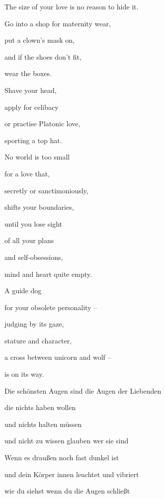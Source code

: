 \bigskip

The size of your love is no reason to hide it.


\bigskip

Go into a shop for maternity wear,

put a clown's mask on, 

and if the shoes don't fit,

wear the boxes.


\bigskip

Shave your head,

apply for celibacy

or practise Platonic love,

sporting a top hat.


\bigskip

No world is too small

for a love that,

secretly or sanctimoniously,

shifts your boundaries,


\bigskip

until you lose sight

of all your plans 

and self-obsessions,

mind and heart quite empty.


\bigskip

A guide dog 

for your obsolete personality -- 

judging by its gaze,

stature and character, 


\bigskip

a cross between unicorn and wolf --

is on its way.


\bigskip


\bigskip



\bigskip

Die schönsten Augen sind die Augen der Liebenden

die nichts haben wollen

und nichts halten müssen

und nicht zu wissen glauben wer sie sind


\bigskip

Wenn es draußen noch fast dunkel ist

und dein Körper innen leuchtet und vibriert

wie du siehst wenn du die Augen schließt

